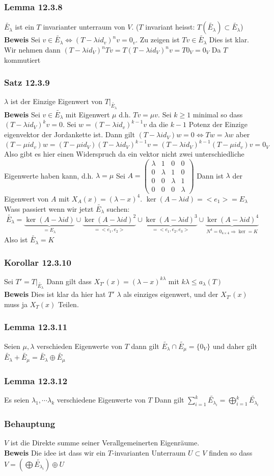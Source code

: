 \documentclass{article}
\newcommand{\satz}[1]{\subsubsection*{Satz {#1}}}
\newcommand{\korollar}[1]{\subsubsection*{Korollar {#1}}}
\newcommand{\beweis}{\\\textbf{Beweis }}
\newcommand{\lemma}[1]{\subsubsection*{Lemma {#1}}}
\newcommand{\behauptung}[1]{\subsubsection*{Behauptung {#1}}}
\begin{document}
\lemma{12.3.8} $\tilde{E_\lambda}$ ist ein $T$ invarianter unterraum von $V$. ($T$ invariant heisst: $T(\tilde{E_\lambda})\subset\tilde{E_\lambda}$)
\beweis Sei $v\in\tilde{E_\lambda}\Leftrightarrow(T-\lambda id_v)^n v=0_v$. Zu zeigen ist $Tv\in \tilde{E_\lambda}$ Dies ist klar. Wir nehmen dann $(T-\lambda id_V)^nTv=T(T-\lambda id_V)^n v=T0_V=0_V$ Da $T$ kommutiert
\satz{12.3.9} $\lambda$ ist der Einzige Eigenwert von $T|_{\tilde{E_\lambda}}$
\beweis Sei $v\in \tilde{E_\lambda}$ mit Eigenwert  $\mu$ d.h. $Tv=\mu v$. Sei $k\ge 1$ minimal so dass $(T-\lambda id_V)^kv=0$. Sei $w=(T-\lambda id_v)^{k-1}v$ da die $k-1$ Potenz der Einzige eigenvektor der Jordankette ist.
Dann gilt $(T-\lambda id_V)w=0\Leftrightarrow Tw=\lambda w$ aber $(T-\mu id_v)w=(T-\mu id_V)(T-\lambda id_V)^{k-1}v=(T-\lambda id_V)^{k-1}(T-\mu id_v)v=0_V$ Also gibt es hier einen Widerspruch da ein vektor nicht zwei unterschiedliche Eigenwerte haben kann, d.h. $\lambda= \mu$
\newline Sei $A=\begin{pmatrix}\lambda&1&0&0\\0&\lambda&1&0\\0&0&\lambda&1\\0&0&0&\lambda\end{pmatrix}$ Dann ist $\lambda$ der Eigenwert von $A$ mit $X_A(x)=(\lambda-x)^4$. $\ker(A-\lambda id)=<e_1>=E_\lambda$
Wass passiert wenn wir jetzt $\tilde{E_\lambda}$ suchen: \[\tilde{E_\lambda}=\underset{=E_\lambda}{\underbrace{\ker(A-\lambda id)}}\cup \underset{=<e_1,e_2>}{\underbrace{\ker(A-\lambda id)^2}}\cup \underset{=<e_1,e_2,e_3>}{\underbrace{\ker(A-\lambda id)^3}}\cup \underset{N^4=0_{4\times 4}\Rightarrow \ker=K}{\underbrace{\ker(A-\lambda id)^4}}\]
Also ist $\tilde{E_\lambda}=K$
\korollar{12.3.10} Sei $T'=T|_{\tilde{E_\lambda}}$ Dann gilt dass $X_{T'}(x)=(\lambda-x)^{k\lambda}$ mit $k\lambda\le a_\lambda(T)$
\beweis Dies ist klar da hier hat $T'$  $\lambda$ als einziges eigenwert, und der $X_{T'}(x)$ muss ja $X_T(x)$ Teilen.
\lemma{12.3.11} Seien $\mu,\lambda$ verschieden Eigenwerte von $T$ dann gilt $\tilde{E_\lambda}\cap \tilde{E_\mu}=\lbrace 0_V\rbrace$ und daher gilt $\tilde{E_\lambda}+\tilde{E_\mu}=\tilde{E_\lambda} \oplus \tilde{E_\mu}$
\lemma{12.3.12} Es seien $\lambda_1,\cdots\lambda_k$ verschiedene Eigenwerte von $T$ Dann gilt $\sum_{i=1}^k \tilde{E_{\lambda_i}}=\bigoplus_{i=1}^k \tilde{E_{\lambda_i}}$
\behauptung{} $V$ ist die Direkte summe seiner Verallgemeinerten Eigenräume.
\beweis Die idee ist dass wir ein $T$-invarianten Unterraum $U\subset V$ finden so dass $V=(\bigoplus \tilde{E_{\lambda_i}})\oplus U$
\end{document}

